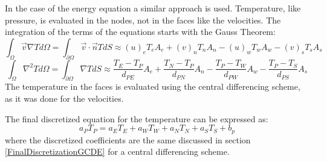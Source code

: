 In the case of the energy equation a similar approach is used. Temperature, like pressure, is evaluated in the nodes, not in the faces like the velocities. The integration of the terms of the equations starts with the Gauss Theorem:
\begin{equation}
\int_{\Omega}\vec{v}\nabla Td\Omega=\int_{\partial\Omega}\vec{v}\cdot\vec{n} TdS\approx\left(u\right)_{e}T_{e}A_{e}+\left(v\right)_{n}T_{n}A_{n}-\left(u\right)_{w}T_{w}A_{w}-\left(v\right)_{s}T_{s}A_{s}
\end{equation}
\begin{equation}
	\int_{\Omega}\nabla^{2}Td\Omega=\int_{\partial\Omega}\nabla TdS\approx\frac{T_{E}-T_{P}}{d_{PE}}A_{e}+\frac{T_{N}-T_{P}}{d_{PN}}A_{n}-\frac{T_{P}-T_{W}}{d_{PW}}A_{w}-\frac{T_{P}-T_{S}}{d_{PS}}A_{s}
\end{equation}
The temperature in the faces is evaluated using the central differencing scheme, as it was done for the velocities.

The final discretized equation for the temperature can be expressed as:
\begin{equation}
a_{P}T_{P}=a_{E}T_{E}+a_{W}T_{W}+a_{N}T_{N}+a_{S}T_{S}+b_{p}
\end{equation}
where the discretized coefficients are the same discussed in section \ref{FinalDiscretizationGCDE} for a central differencing scheme.

